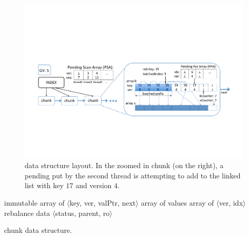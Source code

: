 \begin{figure}[t]
  \centering
  \includegraphics[width=\linewidth]{kiwi-layout4.pdf}
  \caption{{{\kiwi} data structure layout. In the zoomed in chunk (on the right), a pending put by the second
thread is attempting to add  to the linked list with key $17$ and version $4$.}}
  \label{fig:overview-new}
\end{figure}

\begin{algorithm}[t]
\begin{center}
\begin{algorithmic}
	\State immutable   
	\State array  of $\langle$key, ver, valPtr, next$\rangle$      
	\State array  of values								
	\State {}  %
	\State {} 
	\State array  of $\langle$ver, idx$\rangle$ 
	\State {} 
	\State {} 
	\State rebalance data $\langle$status, parent, ro$\rangle$ 
\end{algorithmic}
\end{center}
\caption{{\kiwi} chunk data structure.}
\label{alg:chunk}
\end{algorithm}


